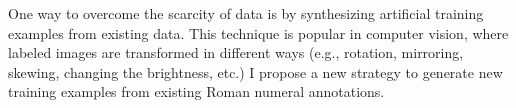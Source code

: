 

One way to overcome the scarcity of data is by synthesizing artificial training examples from existing data. This technique is popular in computer vision, where labeled images are transformed in different ways (e.g., rotation, mirroring, skewing, changing the brightness, etc.) I propose a new strategy to generate new training examples from existing Roman numeral annotations.
